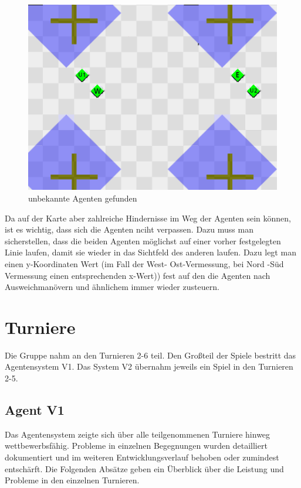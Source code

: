 \documentclass[runningheads]{llncs}
\begin{document}
	\begin{figure}
		\centering
		\includegraphics[scale=0.5]{./Referenzen/Measurement_Step2.png}
		\caption{unbekannte Agenten gefunden}
		\label{measurement2}
	\end{figure}
	
	
	Da auf der Karte aber zahlreiche Hindernisse im Weg der Agenten sein können, ist es wichtig, dass sich die Agenten nciht verpassen. Dazu muss man sicherstellen, dass die beiden Agenten möglichst auf einer vorher festgelegten Linie laufen, damit sie wieder in das Sichtfeld des anderen laufen. Dazu legt man einen y-Koordinaten Wert (im Fall der West- Ost-Vermessung, bei Nord -Süd Vermessung einen entsprechenden x-Wert)) fest auf den die Agenten nach Ausweichmanövern und ähnlichem immer wieder zusteuern.
	
	
	\section{Turniere}\label{Turniere}
	Die Gruppe nahm an den Turnieren 2-6 teil. Den Großteil der Spiele bestritt das Agentensystem V1. Das System V2 übernahm jeweils ein Spiel in den Turnieren 2-5. 
	
	\subsection{Agent V1}
	Das Agentensystem zeigte sich über alle teilgenommenen Turniere hinweg wettbewerbsfähig. Probleme in einzelnen Begegnungen wurden detailliert dokumentiert und im weiteren Entwicklungsverlauf behoben oder zumindest entschärft. Die Folgenden Absätze geben ein Überblick über die Leistung und Probleme in den einzelnen Turnieren.
	
\end{document}
